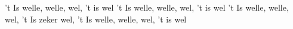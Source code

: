 \beginverse*
't Is welle, welle, wel, 't is wel
't Is welle, welle, wel, 't is wel
't Is welle, welle, wel,
't Is zeker wel,
't Is welle, welle, wel, 't is wel
\endverse
\endsong
